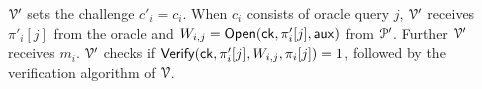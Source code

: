 $\mathcal{V}'$ sets the challenge $c'_i = c_i$. When $c_i$ consists of oracle query $j$, $\mathcal{V}'$ receives $\pi'_i[j]$ from the oracle and $W_{i,j} = \mathsf{Open}(\mathsf{ck}, \pi'_i[j], \mathsf{aux})$ from $\mathcal{P}'$. Further $\mathcal{V}'$ receives $m_i$. $\mathcal{V}'$ checks if $\mathsf{Verify}(\mathsf{ck}, \pi'_i[j], W_{i,j}, \pi_i[j]) = 1$, followed by the verification algorithm of $\mathcal{V}$.

%	



